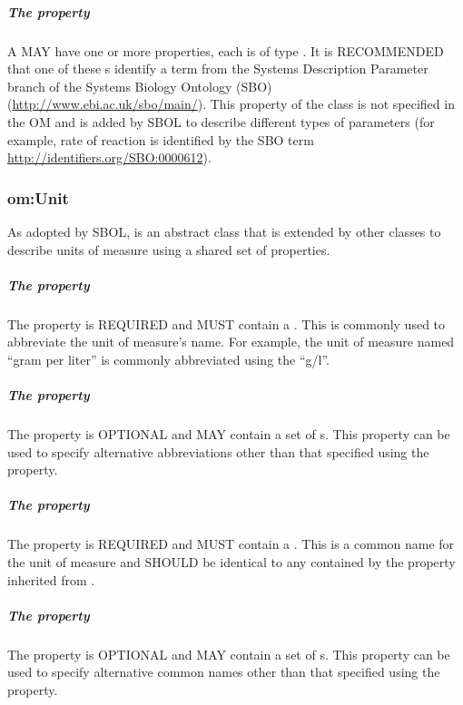 \subparagraph{The  property}\label{sec:type:Measure}

A  MAY have one or more  properties, each is of type . It is RECOMMENDED that one of these s identify a term from the Systems Description Parameter branch of the Systems Biology Ontology (SBO) (\url{http://www.ebi.ac.uk/sbo/main/}). This  property of the  class is not specified in the OM and is added by SBOL to describe different types of parameters 
(for example, rate of reaction is identified by the SBO term \url{http://identifiers.org/SBO:0000612}).

\subsubsection{om:Unit}
\label{sec:om:Unit}

As adopted by SBOL,  is an abstract class that is extended by other classes to describe units of measure using a shared set of properties. 

\subparagraph{The  property}\label{sec:om:symbol:Unit}
The  property is REQUIRED and MUST contain a . This  is commonly used to abbreviate the unit of measure's name. For example, the unit of measure named ``gram per liter'' is commonly abbreviated using the  ``g/l''.

\subparagraph{The  property}\label{sec:om:alternativeSymbols:Unit}
The  property is OPTIONAL and MAY contain a set of s. This property can be used to specify alternative abbreviations other than that specified using the  property.

\subparagraph{The  property}\label{sec:om:label:Unit}
The  property is REQUIRED and MUST contain a . This  is a common name for the unit of measure and SHOULD be identical to any  contained by the  property inherited from .

\subparagraph{The  property}\label{sec:om:alternativeLabels:Unit}
The  property is OPTIONAL and MAY contain a set of s. This property can be used to specify alternative common names other than that specified using the  property.

